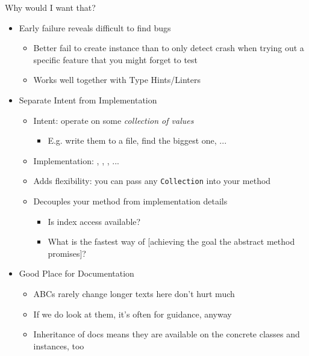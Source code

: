 
\begin{frame}{Why would I want that?}
%
\begin{itemize}
\item Early failure reveals difficult to find bugs
	\begin{itemize}
	\item Better fail to create instance than to only detect crash when trying out a specific feature that you might forget to test
	\item Works well together with Type Hints/Linters
	\end{itemize}
\item Separate Intent from Implementation
	\begin{itemize}
	\item Intent: operate on some \emph{collection of values} \Thus {}
		\begin{itemize}
		\item E.\;g. write them to a file, find the biggest one, ...
		\end{itemize}
	\item Implementation: , , , ...
	\item[\Thus] Adds flexibility: you can pass any \texttt{Collection} into your method
	\item[\Thus] Decouples your method from implementation details
		\begin{itemize}
		\item Is index access available?
		\item What is the fastest way of [achieving the goal the abstract method promises]?
		\end{itemize}
	\end{itemize}
\item Good Place for Documentation
	\begin{itemize}
	\item ABCs rarely change \Thus longer texts here don't hurt much
	\item If we do look at them, it's often for guidance, anyway
	\item Inheritance of docs means they are available on the concrete classes and instances, too
	\end{itemize}
\end{itemize}
%
\end{frame}


